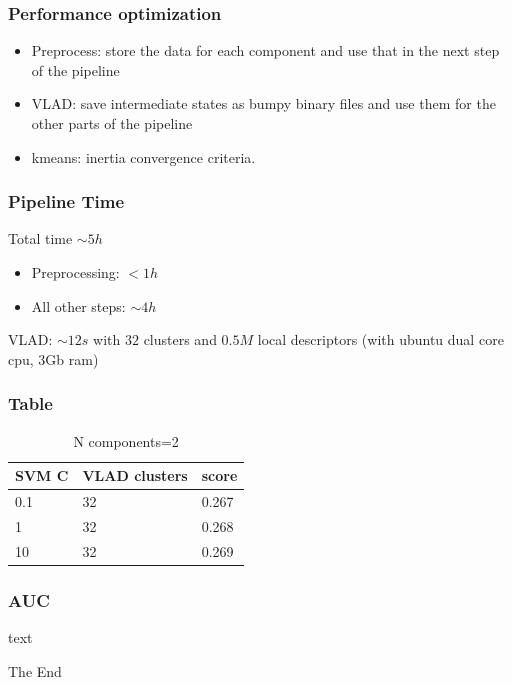 \documentclass{beamer}
\begin{document}
\begin{frame}
\frametitle{Performance optimization}
\begin{itemize}
\item Preprocess:  store the data for each component and use that in the next step of the pipeline
\item VLAD: save intermediate states as bumpy binary files and use them for the other parts of the pipeline
\item kmeans: inertia convergence criteria. 
\end{itemize} 
\end{frame}



\begin{frame}
\frametitle{Pipeline Time}
Total time $ \sim   5h$ 
\begin{itemize}
\item Preprocessing: $< 1h$
\item All other steps:  $\sim4h$ 
\end{itemize}
VLAD:  $ \sim   12s$ with $32$ clusters and $0.5M$ local descriptors (with ubuntu dual core cpu, 3Gb ram)
\end{frame}








\begin{frame}
\frametitle{Table}
\begin{table}
\begin{tabular}{l l l}
\toprule
\textbf{ SVM C} & \textbf{VLAD clusters} & \textbf{score} \\
\midrule
0.1 & 32 & 0.267\\
1 & 32 & 0.268\\
10 & 32 & 0.269\\
\bottomrule
\end{tabular}
\caption{N components=2}
\end{table}
\end{frame}


\begin{frame}
\frametitle{AUC}
text
\end{frame}




\begin{frame}
\Huge{\centerline{The End}}
\end{frame}
\end{document}
